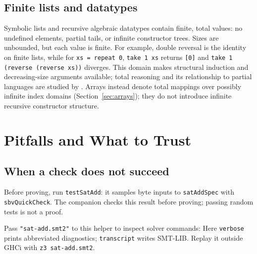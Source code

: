 \documentclass[acmsmall,screen,review,anonymous,nonacm]{acmart}
\newcommand{\code}[1]{\texttt{#1}}
\begin{document}
\subsection{Finite lists and datatypes}
\label{sec:finite-lists}

Symbolic lists and recursive algebraic datatypes contain finite, total values:
no undefined elements, partial tails, or infinite constructor trees. Sizes are
unbounded, but each value is finite. For example, double reversal is the identity
on finite lists, while for \code{xs = repeat 0}, \code{take 1 xs} returns
\code{[0]} and \code{take 1 (reverse (reverse xs))} diverges. This domain makes
structural induction and decreasing-size arguments available; total reasoning
and its relationship to partial languages are studied by
\citet{fastloose}. Arrays instead denote total mappings over possibly infinite
index domains (Section~\ref{sec:arrays}); they do not introduce infinite recursive
constructor structure.

\section{Pitfalls and What to Trust}
\label{sec:pitfalls}

\subsection{When a check does not succeed}
\label{sec:troubleshooting}

Before proving, run \code{testSatAdd}: it samples byte inputs to \code{satAddSpec}
with \code{sbvQuickCheck}. The companion checks this result before proving;
passing random tests is not a proof.

Pass \code{"sat-add.smt2"} to this helper to inspect solver commands:
Here \code{verbose} prints abbreviated diagnostics; \code{transcript} writes
SMT-LIB. Replay it outside GHCi with \code{z3 sat-add.smt2}.
\end{document}
